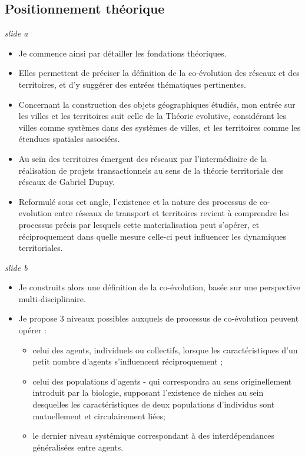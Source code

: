 \documentclass[12pt]{article}
\begin{document}
\newpage


\subsection*{Positionnement théorique}


\textit{slide a}

\begin{itemize}
	\item Je commence ainsi par détailler les fondations théoriques.
	\item Elles permettent de préciser la définition de la co-évolution des réseaux et des territoires, et d'y suggérer des entrées thématiques pertinentes.
	\item Concernant la construction des objets géographiques étudiés, mon entrée sur les villes et les territoires suit celle de la Théorie evolutive, considérant les villes comme systèmes dans des systèmes de villes, et les territoires comme les étendues spatiales associées.
	\item Au sein des territoires émergent des réseaux par l'intermédiaire de la réalisation de projets transactionnels au sens de la théorie territoriale des réseaux de Gabriel Dupuy.
	\item Reformulé sous cet angle, l'existence et la nature des processus de co-evolution entre réseaux de transport et territoires revient à comprendre les processus précis par lesquels cette materialisation peut s'opérer, et réciproquement dans quelle mesure celle-ci peut influencer les dynamiques territoriales.
\end{itemize}

\newpage

\textit{slide b}

\begin{itemize}
	\item Je construits alors une définition de la co-évolution, basée sur une perspective multi-disciplinaire.
	\item Je propose 3 niveaux possibles auxquels de processus de co-évolution peuvent opérer :
	\begin{itemize}
	    \item celui des agents, individuels ou collectifs, lorsque les caractéristiques d'un petit nombre d'agents s'influencent réciproquement ;
	    \item celui des populations d'agents - qui correspondra au sens originellement introduit par la biologie, supposant l'existence de niches au sein desquelles les caractéristiques de deux populations d'individus sont mutuellement et circulairement liées;
	    \item le dernier niveau systémique correspondant à des interdépendances généralisées entre agents.
	\end{itemize}
\end{itemize}
\end{document}
